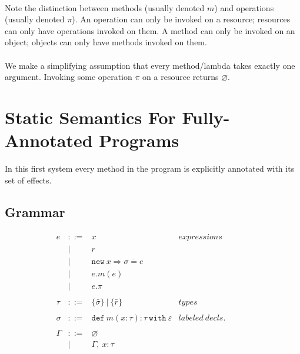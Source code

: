 \documentclass{llncs}
\newcommand{\keywadj}[1]{\mathtt{#1}}
\newcommand{\keyw}[1]{\keywadj{#1}~}
\begin{document}
\paragraph{}
Note the distinction between methods (usually denoted $m$) and operations (usually denoted $\pi$). An operation can only be invoked on a resource; resources can only have operations invoked on them. A method can only be invoked on an object; objects can only have methods invoked on them.

\paragraph{}
We make a simplifying assumption that every method/lambda takes exactly one argument. Invoking some operation $\pi$ on a resource returns $\varnothing$.



\newpage

\section{Static Semantics For Fully-Annotated Programs}

\noindent
In this first system every method in the program is explicitly annotated with its set of effects.

\subsection{Grammar}

\[
\begin{array}{lll}
\begin{array}{lllr}

	e & ::= & x & expressions \\
  		& | & r \\
  		& | & \keywadj{new}~x \Rightarrow \overline{\sigma = e} \\
  		& | & e.m(e)\\
  		& | & e.\pi\\
		&&\\

	\tau & ::= & \{ \bar \sigma \} ~ | ~ \{ \bar r \} & types \\
		&&\\

	\sigma & ::= &  \keyw{def} m(x:\tau):\tau~\keyw{with}\varepsilon  & labeled~ decls.\\
		&&\\
		
	\Gamma & ::= & \varnothing \\
		& | & \Gamma,~x : \tau\\
		&&\\

\end{array}
& ~~~~~~
&
\end{array}
\]
\end{document}
